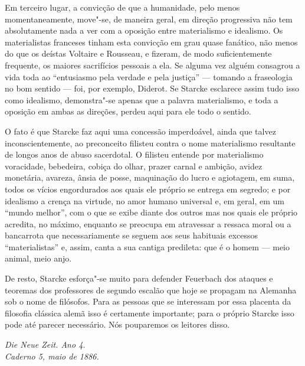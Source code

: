 Em terceiro lugar, a convicção de que a humanidade, pelo menos
momentaneamente, move"-se, de maneira geral, em direção progressiva não %
tem absolutamente nada a ver com a oposição entre materialismo e
idealismo. Os materialistas franceses tinham esta convicção em grau
quase fanático, não menos do que os
deístas Voltaire e Rousseau,
e fizeram, de modo suficientemente frequente, os maiores sacrifícios %
pessoais a ela. Se alguma vez alguém consagrou a vida toda ao
``entusiasmo pela verdade e pela justiça'' --- tomando a fraseologia no
bom sentido --- foi, por
exemplo, Diderot. Se Starcke esclarece %
assim tudo isso como idealismo, demonstra"-se apenas que a palavra %
materialismo, e toda a oposição em ambas as direções, perdeu aqui para ele %
todo o sentido.

O fato é que Starcke faz aqui uma concessão imperdoável, ainda que %
talvez inconscientemente, ao preconceito filisteu contra o nome
materialismo resultante de longos anos de abuso sacerdotal. O filisteu
entende por materialismo voracidade, bebedeira, cobiça do olhar, prazer
carnal e ambição, avidez monetária, avareza, ânsia de posse, maquinação
do lucro e agiotagem, em suma, todos os vícios engordurados aos quais
ele próprio se entrega em segredo; e por idealismo a crença na virtude,
no amor humano universal e, em geral, em um ``mundo melhor'', com o que
se exibe diante dos outros mas nos quais ele próprio acredita, no
máximo, enquanto se preocupa em atravessar a ressaca moral 
ou a bancarrota que necessariamente se seguem aos
seus habituais excessos ``materialistas'' e, assim, canta a sua cantiga
predileta: que é o homem --- meio animal, meio anjo. %

De resto, Starcke esforça"-se muito para
defender Feuerbach dos
ataques e teoremas dos professores de segundo escalão
que hoje se propagam na Alemanha sob o nome de filósofos. Para as pessoas
que se interessam por essa placenta da filosofia clássica alemã isso é
certamente importante; para o próprio Starcke isso pode até
parecer necessário. Nós pouparemos os leitores disso.

\quebra

\begin{flushright}
\emph{Die Neue Zeit. Ano 4.}\\
\emph{Caderno 5, maio de 1886.}
\end{flushright}


